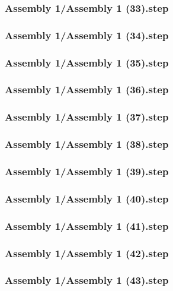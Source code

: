 \documentclass[a4paper,12pt]{article}
\begin{document}
\begin{lstlising}[language=C++]
\subsubsection{Assembly 1/Assembly 1 (33).step}

\subsubsection{Assembly 1/Assembly 1 (34).step}

\subsubsection{Assembly 1/Assembly 1 (35).step}

\subsubsection{Assembly 1/Assembly 1 (36).step}

\subsubsection{Assembly 1/Assembly 1 (37).step}

\subsubsection{Assembly 1/Assembly 1 (38).step}

\subsubsection{Assembly 1/Assembly 1 (39).step}

\subsubsection{Assembly 1/Assembly 1 (40).step}

\subsubsection{Assembly 1/Assembly 1 (41).step}

\subsubsection{Assembly 1/Assembly 1 (42).step}

\subsubsection{Assembly 1/Assembly 1 (43).step}


\end{lstlising}
\end{document}
